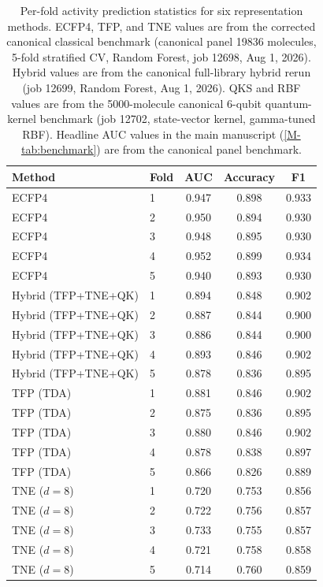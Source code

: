 \documentclass[11pt,a4paper]{article}
\begin{document}
\begin{table}[htbp]
\centering
\caption{Per-fold activity prediction statistics for six representation methods. ECFP4, TFP, and TNE values are from the corrected canonical classical benchmark (canonical panel \num{19836} molecules, 5-fold stratified CV, Random Forest, job 12698, Aug 1, 2026). Hybrid values are from the canonical full-library hybrid rerun (job 12699, Random Forest, Aug 1, 2026). QKS and RBF values are from the \num{5000}-molecule canonical 6-qubit quantum-kernel benchmark (job 12702, state-vector kernel, gamma-tuned RBF). Headline AUC values in the main manuscript (\cref{M-tab:benchmark}) are from the canonical panel benchmark.}
\label{tab:sm_s4_perfold}
\small
\begin{tabularx}{\textwidth}{l l S[table-format=1.3] S[table-format=1.3] S[table-format=1.3]}
\toprule
Method & Fold & {AUC} & {Accuracy} & {F1} \\
\midrule
ECFP4 & 1 & 0.947 & 0.898 & 0.933 \\
ECFP4 & 2 & 0.950 & 0.894 & 0.930 \\
ECFP4 & 3 & 0.948 & 0.895 & 0.930 \\
ECFP4 & 4 & 0.952 & 0.899 & 0.934 \\
ECFP4 & 5 & 0.940 & 0.893 & 0.930 \\
\midrule
Hybrid (TFP+TNE+QK) & 1 & 0.894 & 0.848 & 0.902 \\
Hybrid (TFP+TNE+QK) & 2 & 0.887 & 0.844 & 0.900 \\
Hybrid (TFP+TNE+QK) & 3 & 0.886 & 0.844 & 0.900 \\
Hybrid (TFP+TNE+QK) & 4 & 0.893 & 0.846 & 0.902 \\
Hybrid (TFP+TNE+QK) & 5 & 0.878 & 0.836 & 0.895 \\
\midrule
TFP (TDA) & 1 & 0.881 & 0.846 & 0.902 \\
TFP (TDA) & 2 & 0.875 & 0.836 & 0.895 \\
TFP (TDA) & 3 & 0.880 & 0.846 & 0.902 \\
TFP (TDA) & 4 & 0.878 & 0.838 & 0.897 \\
TFP (TDA) & 5 & 0.866 & 0.826 & 0.889 \\
\midrule
TNE ($d=8$) & 1 & 0.720 & 0.753 & 0.856 \\
TNE ($d=8$) & 2 & 0.722 & 0.756 & 0.857 \\
TNE ($d=8$) & 3 & 0.733 & 0.755 & 0.857 \\
TNE ($d=8$) & 4 & 0.721 & 0.758 & 0.858 \\
TNE ($d=8$) & 5 & 0.714 & 0.760 & 0.859 \\

\end{tabularx}
\end{table}
\end{document}
